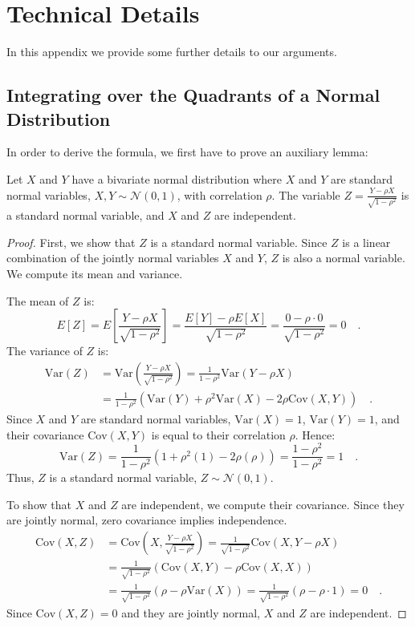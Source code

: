\documentclass[../../main.tex]{subfiles}
\begin{document}
\section{Technical Details}
\label{section:technical_details}
In this appendix we provide some further details to our arguments.

\subsection{Integrating over the Quadrants of a Normal Distribution}
\label{section:integrating_quadrants}
In order to derive the formula, we first have to prove an auxiliary lemma:

\begin{lemma}
Let $X$ and $Y$ have a bivariate normal distribution where $X$ and $Y$ are standard normal variables, $X, Y \sim \mathcal{N}(0,1)$, with correlation $\rho$. The variable $Z = \frac{Y-\rho X}{\sqrt{1-\rho^2}}$ is a standard normal variable, and $X$ and $Z$ are independent.
\end{lemma}

\begin{proof}
First, we show that $Z$ is a standard normal variable. Since $Z$ is a linear combination of the jointly normal variables $X$ and $Y$, $Z$ is also a normal variable. We compute its mean and variance.

The mean of $Z$ is:
$$ E[Z] = E\left[\frac{Y-\rho X}{\sqrt{1-\rho^2}}\right] = \frac{E[Y]-\rho E[X]}{\sqrt{1-\rho^2}} = \frac{0 - \rho \cdot 0}{\sqrt{1-\rho^2}} = 0 \quad .$$
The variance of $Z$ is:
\begin{align*}
    \text{Var}(Z) &= \text{Var}\left(\frac{Y-\rho X}{\sqrt{1-\rho^2}}\right) = \frac{1}{1-\rho^2}\text{Var}(Y-\rho X) \\
    &= \frac{1}{1-\rho^2}\left(\text{Var}(Y) + \rho^2\text{Var}(X) - 2\rho\text{Cov}(X,Y)\right) \quad .
\end{align*}
Since $X$ and $Y$ are standard normal variables, $\text{Var}(X) = 1$, $\text{Var}(Y) = 1$, and their covariance $\text{Cov}(X,Y)$ is equal to their correlation $\rho$. Hence:
$$ \text{Var}(Z) = \frac{1}{1-\rho^2}(1 + \rho^2(1) - 2\rho(\rho)) = \frac{1-\rho^2}{1-\rho^2} = 1 \quad . $$
Thus, $Z$ is a standard normal variable, $Z \sim \mathcal{N}(0,1)$.

To show that $X$ and $Z$ are independent, we compute their covariance. Since they are jointly normal, zero covariance implies independence.
\begin{align*}
    \text{Cov}(X,Z) &= \text{Cov}\left(X, \frac{Y-\rho X}{\sqrt{1-\rho^2}}\right) = \frac{1}{\sqrt{1-\rho^2}}\text{Cov}(X, Y-\rho X) \\
    &= \frac{1}{\sqrt{1-\rho^2}}\left(\text{Cov}(X,Y) - \rho\text{Cov}(X,X)\right) \\
    &= \frac{1}{\sqrt{1-\rho^2}}\left(\rho - \rho\text{Var}(X)\right) = \frac{1}{\sqrt{1-\rho^2}}(\rho - \rho \cdot 1) = 0 \quad .
\end{align*}
Since $\text{Cov}(X,Z)=0$ and they are jointly normal, $X$ and $Z$ are independent.
\end{proof}
\end{document}
